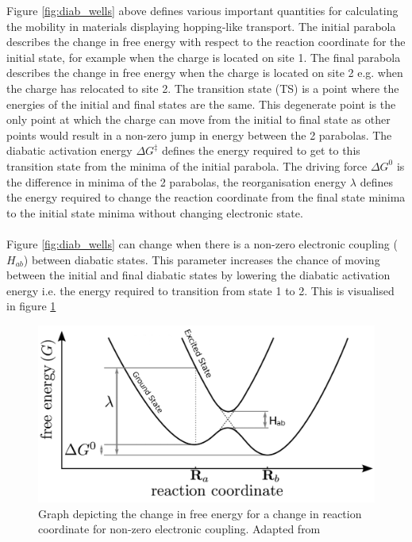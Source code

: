 Figure \ref{fig:diab_wells} above defines various important quantities for calculating the mobility in materials displaying hopping-like transport. The initial parabola describes the change in free energy with respect to the reaction coordinate for the initial state, for example when the charge is located on site 1. The final parabola describes the change in free energy when the charge is located on site 2 e.g. when the charge has relocated to site 2. The transition state (TS) is a point where the energies of the initial and final states are the same. This degenerate point is the only point at which the charge can move from the initial to final state as other points would result in a non-zero jump in energy between the 2 parabolas. The diabatic activation energy $\Delta G^{\ddagger}$ defines the energy required to get to this transition state from the minima of the initial parabola. The driving force $\Delta G^{0}$ is the difference in minima of the 2 parabolas, the reorganisation energy $\lambda$ defines the energy required to change the reaction coordinate from the final state minima to the initial state minima without changing electronic state.
\\\\
Figure \ref{fig:diab_wells} can change when there is a non-zero electronic coupling ($H_{ab}$) between diabatic states. This parameter increases the chance of moving between the initial and final diabatic states by lowering the diabatic activation energy i.e. the energy required to transition from state 1 to 2. This is visualised in figure \ref{fig:adiab_wells}
\begin{figure}[ht]
  \includegraphics[width=\textwidth]{./img/adiabatic_wells.png}
  \caption{Graph depicting the change in free energy for a change in reaction coordinate for non-zero electronic coupling. Adapted from \cite{oberhofer_charge_2017}}
  \label{fig:adiab_wells}
\end{figure}
